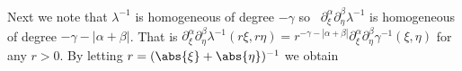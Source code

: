 \documentclass[10pt,a4paper]{article}
\begin{document}
Next we note that $\lambda^{-1}$ is homogeneous of degree $-\gamma$ so \
$\partial^\alpha_\xi \partial^\beta_\eta \lambda^{-1}$ 
is homogeneous of degree $-\gamma -|\alpha + \beta|$. 
That is $\partial^\alpha_\xi 
\partial^\beta_\eta 
\lambda^{-1} (r \xi, r \eta) = 
r^{-\gamma -|\alpha+\beta|}\partial^\alpha_\xi \partial^\beta_\eta \gamma^{-1}(\xi,\eta)$ for any $r>0$. 
By letting $r = (\abs{\xi} + \abs{\eta})^{-1}$ we obtain 


\end{document}
